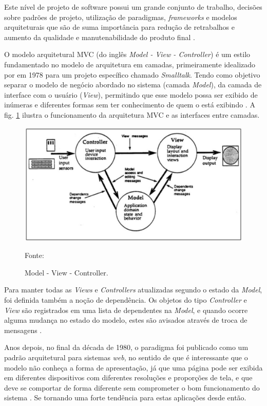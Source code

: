 Este nível de projeto de software possui um grande conjunto de trabalho, decisões sobre padrões de projeto, utilização de paradigmas, \textit{frameworks} e modelos arquiteturais que são de suma importância para redução de retrabalhos e aumento da qualidade e manutenabilidade do produto final \cite{krasner1988}.

O modelo arquitetural MVC (do inglês \textit{Model - View - Controller}) é um estilo fundamentado no modelo de arquitetura em camadas, primeiramente idealizado por  em 1978 para um projeto específico chamado \textit{Smalltalk}. Tendo como objetivo separar o modelo de negócio abordado no sistema (camada \textit{Model}), da camada de interface com o usuário (\textit{View}), permitindo que esse modelo possa ser exibido de inúmeras e diferentes formas sem ter conhecimento de quem o está exibindo \cite{krasner1988}. A fig. \ref{fig:mvc} ilustra o funcionamento da arquitetura MVC e as interfaces entre camadas. 


\begin{figure}[h!]
	\centering
  	\includegraphics[width=.9\linewidth]{figuras/mvc.eps}
  	\caption{Model - View - Controller.}
	\small{Fonte: \cite{krasner1988}}
  	\label{fig:mvc}
\end{figure} 

Para manter todas as \textit{Views} e \textit{Controllers} atualizadas segundo o estado da \textit{Model}, foi definida também a noção de dependência. Os objetos do tipo \textit{Controller} e \textit{View} são registrados em uma lista de dependentes na \textit{Model}, e quando ocorre alguma mudança no estado do modelo, estes são avisados através de troca de mensagens \cite{krasner1988}. 

Anos depois, no final da década de 1980, o paradigma foi publicado como um padrão arquitetural para sistemas \textit{web}, no sentido de que é interessante que o modelo não conheça a forma de apresentação, já que uma página pode ser exibida em diferentes dispositivos com diferentes resoluções e proporções de tela, e que deve se comportar de forma diferente sem comprometer o bom funcionamento do sistema \cite{krasner1988}. Se tornando uma forte tendência para estas aplicações desde então.

